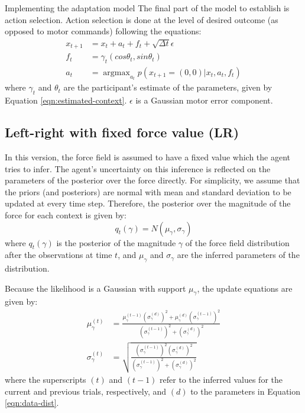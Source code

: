 \documentclass{report}
\DeclareMathOperator*{\argmax}{argmax}
\def \eref #1{Equation \ref{#1}}   %
\begin{document}
\begin{chapter}{Implementing the adaptation model}
The final part of the model to establish is action selection. Action selection
is done at the level of desired outcome (as opposed to motor commands)
following the equations:
\begin{align}
  x_{t+1} &= x_t + a_t + f_t + \sqrt{\Delta
            t}\epsilon\\ \label{eqn:dynamics}
  f_t &= \gamma_t (cos\theta_t, sin\theta_t) \\
  a_t &= \argmax_{a_t}p(x_{t+1} = (0, 0) | x_t, a_t, f_t)
\end{align}
where $\gamma_t$ and $\theta_t$ are the participant's estimate of
the parameters, given by \eref{eqn:estimated-context}. $\epsilon$ is a Gaussian
motor error component.



\subsection{Left-right with fixed force value (LR)}
In this version, the force field is assumed to have a fixed value which the
agent tries to infer. The agent's uncertainty on this inference is reflected on
the parameters of the posterior over the force directly. For simplicity, we
assume that the priors (and posteriors) are normal with mean and standard
deviation to be updated at every time step. Therefore, the posterior over the
magnitude of the force for each context is given by:
\begin{equation}
q_t(\gamma) = N(\mu_{\gamma}, \sigma_\gamma)
\end{equation}
where $q_t(\gamma)$ is the posterior of the magnitude $\gamma$ of the force
field distribution after the observations at time $t$, and $\mu_\gamma$ and
$\sigma_\gamma$ are the inferred parameters of the distribution.

Because the likelihood is a Gaussian with support $\mu_\gamma$, the update
equations are given by:
\begin{align}
  \mu_\gamma^{(t)} &= \frac{\mu_\gamma^{(t-1)}\left(\sigma_\gamma^{(d)}\right)^2 + \mu_\gamma^{(d)}\left(\sigma_\gamma^{(t-1)}\right)^2}{\left(\sigma_\gamma^{(t-1)}\right)^2 + \left(\sigma_\gamma^{(d)}\right)^2} \\
  \sigma_\gamma^{(t)} & = \sqrt{\frac{\left(\sigma_\gamma^{(t-1)}\right)^2\left(\sigma_\gamma^{(d)}\right)^2}{\left(\sigma_\gamma^{(t-1)}\right)^2 + \left(\sigma_\gamma^{(d)}\right)^2}}
\end{align}
where the superscripts $(t)$ and $(t-1)$ refer to the inferred values for the current and previous trials, respectively, and $(d)$ to the parameters in \eref{eqn:data-dist}.


\end{chapter}
\end{document}

